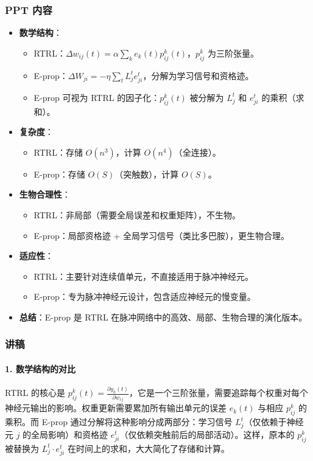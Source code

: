 \documentclass[journal,12pt,onecolumn]{IEEEtran}
\begin{document}
\subsubsection*{PPT 内容}
\begin{itemize}
    \item \textbf{数学结构}：
        \begin{itemize}
            \item RTRL：$\Delta w_{ij}(t) = \alpha \sum_k e_k(t) p_{ij}^k(t)$，$p_{ij}^k$ 为三阶张量。
            \item E-prop：$\Delta W_{ji} = -\eta \sum_t L_j^t e_{ji}^t$，分解为学习信号和资格迹。
            \item E-prop 可视为 RTRL 的因子化：$p_{ij}^k(t)$ 被分解为 $L_j^t$ 和 $e_{ji}^t$ 的乘积（求和）。
        \end{itemize}
    \item \textbf{复杂度}：
        \begin{itemize}
            \item RTRL：存储 $O(n^3)$，计算 $O(n^4)$（全连接）。
            \item E-prop：存储 $O(S)$（突触数），计算 $O(S)$。
        \end{itemize}
    \item \textbf{生物合理性}：
        \begin{itemize}
            \item RTRL：非局部（需要全局误差和权重矩阵），不生物。
            \item E-prop：局部资格迹 + 全局学习信号（类比多巴胺），更生物合理。
        \end{itemize}
    \item \textbf{适应性}：
        \begin{itemize}
            \item RTRL：主要针对连续值单元，不直接适用于脉冲神经元。
            \item E-prop：专为脉冲神经元设计，包含适应神经元的慢变量。
        \end{itemize}
    \item \textbf{总结}：E-prop 是 RTRL 在脉冲网络中的高效、局部、生物合理的演化版本。
\end{itemize}

\subsubsection*{讲稿}

\paragraph{1. 数学结构的对比}
RTRL 的核心是 $p_{ij}^k(t) = \frac{\partial y_k(t)}{\partial w_{ij}}$，它是一个三阶张量，需要追踪每个权重对每个神经元输出的影响。权重更新需要累加所有输出单元的误差 $e_k(t)$ 与相应 $p_{ij}^k$ 的乘积。而 E-prop 通过分解将这种影响分成两部分：学习信号 $L_j^t$（仅依赖于神经元 $j$ 的全局影响）和资格迹 $e_{ji}^t$（仅依赖突触前后的局部活动）。这样，原本的 $p_{ij}^k$ 被替换为 $L_j^t \cdot e_{ji}^t$ 在时间上的求和，大大简化了存储和计算。
\end{document}
